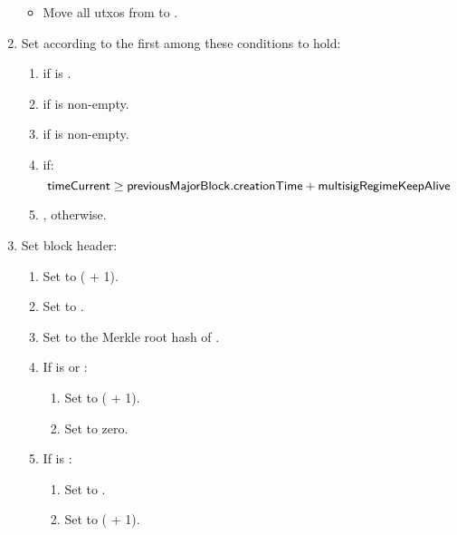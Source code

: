\documentclass[../hydrozoa.tex]{subfiles}
\begin{document}
\begin{enumerate}
    \begin{itemize}
      \item Move all utxos from  to .
    \end{itemize}
  \item Set  according to the first among these conditions to hold:
    \begin{enumerate}
      \item {} if  is .
      \item {} if  is non-empty.
      \item {} if  is non-empty.
      \item {} if:
        \begin{equation*}
          \mathsf{timeCurrent} \geq \mathsf{previousMajorBlock.creationTime} + \mathsf{multisigRegimeKeepAlive}
        \end{equation*}
      \item {}, otherwise.
    \end{enumerate}
  \item Set block header:
    \begin{enumerate}
      \item Set  to ( + 1).
      \item Set  to .
      \item Set  to the Merkle root hash of .
      \item If  is  or :
        \begin{enumerate}
          \item Set  to ( + 1).
          \item Set  to zero.
        \end{enumerate}
      \item If  is :
        \begin{enumerate}
          \item Set  to .
          \item Set  to ( + 1).
        \end{enumerate}
    \end{enumerate}
\end{enumerate}
\end{document}
